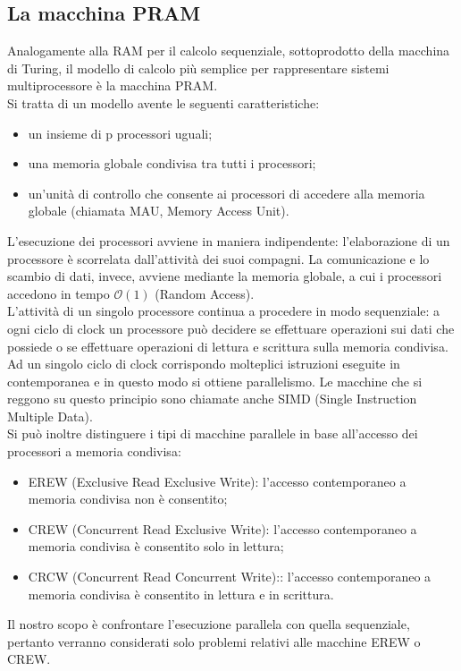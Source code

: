 \subsection{La macchina PRAM}
Analogamente alla RAM per il calcolo sequenziale, sottoprodotto della macchina di Turing, il modello di calcolo più semplice per rappresentare sistemi multiprocessore è la macchina PRAM.\\
Si tratta di un modello avente le seguenti caratteristiche:
\begin{itemize}
\item{un insieme di p processori uguali;}
\item{una memoria globale condivisa tra tutti i processori;}
\item{un'unità di controllo che consente ai processori di accedere alla memoria globale (chiamata MAU, Memory Access Unit).}
\end{itemize}
L'esecuzione dei processori avviene in maniera indipendente: l'elaborazione di un processore è scorrelata dall'attività dei suoi compagni. La comunicazione e lo scambio di dati, invece, avviene mediante la memoria globale, a cui i processori accedono in tempo $\mathcal {O}(1)$ (Random Access).\\
L'attività di un singolo processore continua a procedere in modo sequenziale: a ogni ciclo di clock un processore può decidere se effettuare operazioni sui dati che possiede o se effettuare operazioni di lettura e scrittura sulla memoria condivisa. Ad un singolo ciclo di clock corrispondo molteplici istruzioni eseguite in contemporanea e in questo modo si ottiene parallelismo. Le macchine che si reggono su questo principio sono chiamate anche SIMD (Single Instruction Multiple Data).\\
Si può inoltre distinguere i tipi di macchine parallele in base all'accesso dei processori a memoria condivisa:
\begin{itemize}
\item{EREW (Exclusive Read Exclusive Write): l'accesso contemporaneo a memoria condivisa non è consentito;}
\item{CREW (Concurrent Read Exclusive Write): l'accesso contemporaneo a memoria condivisa è consentito solo in lettura;}
\item{CRCW (Concurrent Read Concurrent Write):: l'accesso contemporaneo a memoria condivisa è consentito in lettura e in scrittura.}
\end{itemize}
Il nostro scopo è confrontare l'esecuzione parallela con quella sequenziale, pertanto verranno considerati solo problemi relativi alle macchine EREW o CREW.
